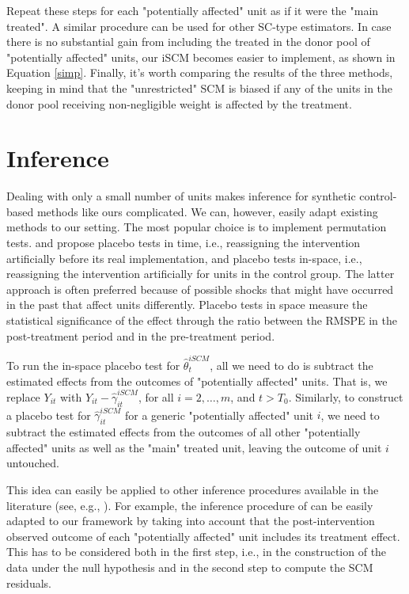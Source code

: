 Repeat these steps for each "potentially affected" unit as if it were the "main treated". A similar procedure can be used for other SC-type estimators.  In case there is no substantial gain from including the treated in the donor pool of "potentially affected" units, our iSCM becomes easier to implement, as shown in Equation \ref{simp}. Finally, it's worth comparing the results of the three methods, keeping in mind that the "unrestricted" SCM is biased if any of the units in the donor pool receiving non-negligible weight is affected by the treatment. 


\section{Inference}\label{inference}
Dealing with only a small number of units makes inference for synthetic control-based methods like ours complicated. We can, however, easily adapt existing methods to our setting. The most popular choice is to implement permutation tests. \cite{Aba2010} and \cite{Aba2015} propose placebo tests in time, i.e., reassigning the intervention artificially before its real implementation, and placebo tests in-space, i.e., reassigning the intervention artificially for units in the control group. The latter approach is often preferred because of possible shocks that might have occurred in the past that affect units differently. Placebo tests in space measure the statistical significance of the effect through the ratio between the RMSPE in the post-treatment period and in the pre-treatment period. 


To run the in-space placebo test for $\widehat\theta_t^{iSCM}$, all we need to do is subtract the estimated effects from the outcomes of "potentially affected" units. That is, we replace $Y_{it}$ with $Y_{it} - \widehat\gamma_{it}^{iSCM}$, for all $i = 2, \ldots, m$, and $t > T_0$. Similarly, to construct a placebo test for $\widehat\gamma_{it}^{iSCM}$ for a generic "potentially affected" unit $i$, we need to subtract the estimated effects from the outcomes of all other "potentially affected" units as well as the "main" treated unit, leaving the outcome of unit $i$ untouched.









This idea can easily be applied to other inference procedures available in the literature (see, e.g., \citealt{Cao2019,Che2019, Fir2018,Gob2016,Li2019}).
For example,  the inference procedure of \cite{Che2019} can be easily adapted to our framework by taking into account that the post-intervention observed outcome of each "potentially affected" unit includes its treatment effect. This has to be considered both in the first step, i.e., in the construction of the data under the null hypothesis and in the second step to compute the SCM residuals.

